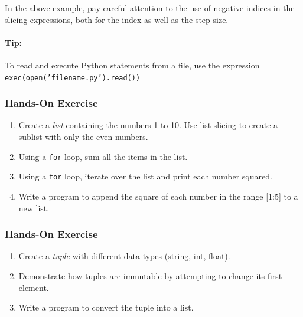 \noindent In the above example, pay careful attention to the use of negative indices in the slicing expressions, both for the index as well as the step size.

\begin{tcolorbox}[colback=code]
\paragraph*{Tip:} To read and execute Python statements from a file, use the expression \texttt{exec(open('filename.py').read())}
\end{tcolorbox}

\begin{tcolorbox}[colback=code]
\subsubsection*{Hands-On Exercise}
\begin{enumerate}
    \item Create a \emph{list} containing the numbers 1 to 10. Use list slicing to create a sublist with only the even numbers.
    \item Using a \texttt{for} loop, sum all the items in the list.
    \item Using a \texttt{for} loop, iterate over the list and print each number squared.
    \item Write a program to append the square of each number in the range [1:5] to a new list.
\end{enumerate}
\end{tcolorbox}

\begin{tcolorbox}[colback=code]
\subsubsection*{Hands-On Exercise}
\begin{enumerate}
    \item Create a \emph{tuple} with different data types (string, int, float).
    \item Demonstrate how tuples are immutable by attempting to change its first element.
    \item Write a program to convert the tuple into a list.
\end{enumerate}
\end{tcolorbox}

